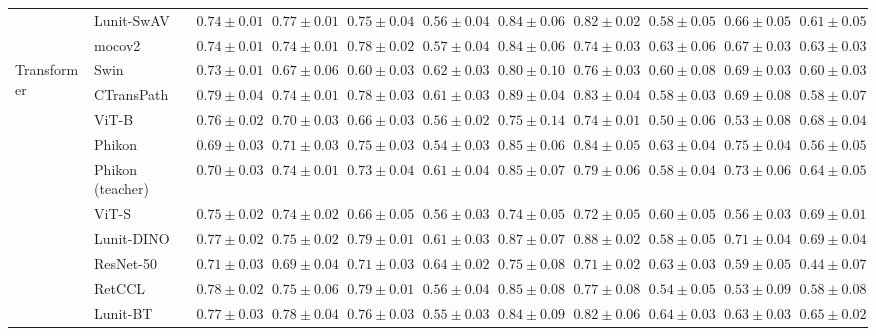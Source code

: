 \begin{tabular}{ll|cccc|c|cccc}
 & Lunit-SwAV & $0.74 \pm 0.01$ & $0.77 \pm 0.01$ & $0.75 \pm 0.04$ & $0.56 \pm 0.04$ & $0.84 \pm 0.06$ & $0.82 \pm 0.02$ & $0.58 \pm 0.05$ & $0.66 \pm 0.05$ & $0.61 \pm 0.05$ \\
 & mocov2 & $0.74 \pm 0.01$ & $0.74 \pm 0.01$ & $0.78 \pm 0.02$ & $0.57 \pm 0.04$ & $0.84 \pm 0.06$ & $0.74 \pm 0.03$ & $\mathbf{0.63 \pm 0.06}$ & $0.67 \pm 0.03$ & $0.63 \pm 0.03$ \\
\cline{1-11}
\multirow[t]{12}{*}{Transformer} & Swin & $0.73 \pm 0.01$ & $0.67 \pm 0.06$ & $0.60 \pm 0.03$ & $0.62 \pm 0.03$ & $0.80 \pm 0.10$ & $0.76 \pm 0.03$ & $0.60 \pm 0.08$ & $0.69 \pm 0.03$ & $0.60 \pm 0.03$ \\
 & CTransPath & $\mathbf{0.79 \pm 0.04}$ & $0.74 \pm 0.01$ & $0.78 \pm 0.03$ & $0.61 \pm 0.03$ & $\mathbf{0.89 \pm 0.04}$ & $0.83 \pm 0.04$ & $0.58 \pm 0.03$ & $0.69 \pm 0.08$ & $0.58 \pm 0.07$ \\
 & ViT-B & $0.76 \pm 0.02$ & $0.70 \pm 0.03$ & $0.66 \pm 0.03$ & $0.56 \pm 0.02$ & $0.75 \pm 0.14$ & $0.74 \pm 0.01$ & $0.50 \pm 0.06$ & $0.53 \pm 0.08$ & $0.68 \pm 0.04$ \\
 & Phikon & $0.69 \pm 0.03$ & $0.71 \pm 0.03$ & $0.75 \pm 0.03$ & $0.54 \pm 0.03$ & $0.85 \pm 0.06$ & $0.84 \pm 0.05$ & $0.63 \pm 0.04$ & $\mathbf{0.75 \pm 0.04}$ & $0.56 \pm 0.05$ \\
 & Phikon (teacher) & $0.70 \pm 0.03$ & $0.74 \pm 0.01$ & $0.73 \pm 0.04$ & $0.61 \pm 0.04$ & $0.85 \pm 0.07$ & $0.79 \pm 0.06$ & $0.58 \pm 0.04$ & $0.73 \pm 0.06$ & $0.64 \pm 0.05$ \\
 & ViT-S & $0.75 \pm 0.02$ & $0.74 \pm 0.02$ & $0.66 \pm 0.05$ & $0.56 \pm 0.03$ & $0.74 \pm 0.05$ & $0.72 \pm 0.05$ & $0.60 \pm 0.05$ & $0.56 \pm 0.03$ & $\mathbf{0.69 \pm 0.01}$ \\
 & Lunit-DINO & $0.77 \pm 0.02$ & $0.75 \pm 0.02$ & $0.79 \pm 0.01$ & $0.61 \pm 0.03$ & $0.87 \pm 0.07$ & $\mathbf{0.88 \pm 0.02}$ & $0.58 \pm 0.05$ & $0.71 \pm 0.04$ & $0.69 \pm 0.04$ \\
 & ResNet-50 & $0.71 \pm 0.03$ & $0.69 \pm 0.04$ & $0.71 \pm 0.03$ & $\mathbf{0.64 \pm 0.02}$ & $0.75 \pm 0.08$ & $0.71 \pm 0.02$ & $0.63 \pm 0.03$ & $0.59 \pm 0.05$ & $0.44 \pm 0.07$ \\
 & RetCCL & $0.78 \pm 0.02$ & $0.75 \pm 0.06$ & $\mathbf{0.79 \pm 0.01}$ & $0.56 \pm 0.04$ & $0.85 \pm 0.08$ & $0.77 \pm 0.08$ & $0.54 \pm 0.05$ & $0.53 \pm 0.09$ & $0.58 \pm 0.08$ \\
 & Lunit-BT & $0.77 \pm 0.03$ & $0.78 \pm 0.04$ & $0.76 \pm 0.03$ & $0.55 \pm 0.03$ & $0.84 \pm 0.09$ & $0.82 \pm 0.06$ & $\mathbf{0.64 \pm 0.03}$ & $0.63 \pm 0.03$ & $0.65 \pm 0.02$ \\

\end{tabular}
